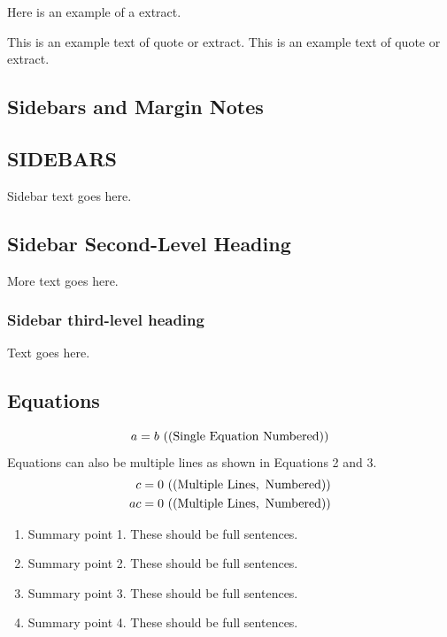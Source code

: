 \documentclass{ar-1col}
\begin{document}
Here is an example of a extract.
\begin{extract}
This is an example text of quote or extract.
This is an example text of quote or extract.
\end{extract}

\subsection{Sidebars and Margin Notes}
\begin{marginnote}[]
\end{marginnote}

\begin{textbox}[h]\section{SIDEBARS}
Sidebar text goes here.
\subsection{Sidebar Second-Level Heading}
More text goes here.\subsubsection{Sidebar third-level heading}
Text goes here.\end{textbox}



\subsection{Equations}
\begin{equation}
a = b \ {\rm ((Single\ Equation\ Numbered))}
\end{equation}
Equations can also be multiple lines as shown in Equations 2 and 3.
\begin{eqnarray}
c = 0 \ {\rm ((Multiple\  Lines, \ Numbered))}\\
ac = 0 \ {\rm ((Multiple \ Lines, \ Numbered))}
\end{eqnarray}

\begin{summary}
\begin{enumerate}
\item Summary point 1. These should be full sentences.
\item Summary point 2. These should be full sentences.
\item Summary point 3. These should be full sentences.
\item Summary point 4. These should be full sentences.
\end{enumerate}
\end{summary}
\end{document}
